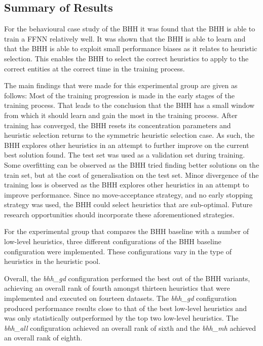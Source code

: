 \subsection{Summary of Results}
\label{sec:conclusion:results}

For the behavioural case study of the \acs{BHH} it was found that the \ac{BHH} is able to train a \acf{FFNN} relatively well. It was shown that the \ac{BHH} is able to learn and that the \acs{BHH} is able to exploit small performance biases as it relates to heuristic selection. This enables the \acs{BHH} to select the correct heuristics to apply to the correct entities at the correct time in the training process.

The main findings that were made for this experimental group are given as follows: Most of the training progression is made in the early stages of the training process. That leads to the conclusion that the \acs{BHH} has a small window from which it should learn and gain the most in the training process. After training has converged, the \acs{BHH} resets its concentration parameters and heuristic selection returns to the symmetric heuristic selection case. As such, the \acs{BHH} explores other heuristics in an attempt to further improve on the current best solution found. The test set was used as a validation set during training. Some overfitting can be observed as the \acs{BHH} tried finding better solutions on the train set, but at the cost of generalisation on the test set. Minor divergence of the training loss is observed as the \acs{BHH} explores other heuristics in an attempt to improve performance. Since no move-acceptance strategy, and no early stopping strategy was used, the \acs{BHH} could select heuristics that are sub-optimal. Future research opportunities should incorporate these aforementioned strategies.

For the experimental group that compares the \acs{BHH} baseline with a number of  low-level heuristics, three different configurations of the \acs{BHH} baseline configuration were implemented. These configurations vary in the type of heuristics in the heuristic pool.

Overall, the \textit{bhh\_gd} configuration performed the best out of the \acs{BHH} variants, achieving an overall rank of fourth amongst thirteen heuristics that were implemented and executed on fourteen datasets. The \textit{bhh\_gd} configuration produced performance results close to that of the best low-level heuristics and was only statistically outperformed by the top two low-level heuristics. The \textit{bhh\_all} configuration achieved an overall rank of sixth and the \textit{bhh\_mh} achieved an overall rank of eighth.

